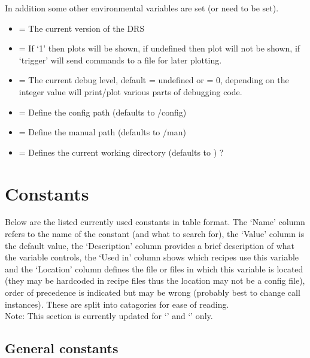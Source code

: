 In addition some other environmental variables are set (or need to be set).
\begin{itemize}
	\item {} = The current version of the DRS
	\item {} = If `1' then plots will be shown, if undefined then plot will not be shown, if `trigger' will send commands to a file for later plotting.
	\item {} = The current debug level, default = undefined or = 0, depending on the integer value will print/plot various parts of debugging code.
	\item {} = Define the config path (defaults to /config)
	\item {} = Define the manual path (defaults to /man)
	\item {} = Defines the current working directory (defaults to ) ?
\end{itemize} 

\section{Constants}
\label{section:the_constants}

Below are the listed currently used constants in table format. The `Name' column refers to the name of the constant (and what to search for), the `Value' column is the default value, the `Description' column provides a brief description of what the variable controls, the `Used in' column shows which recipes use this variable and the `Location' column defines the file or files in which this variable is located (they may be hardcoded in recipe files thus the location may not be a config file), order of precedence is indicated but may be wrong (probably best to change call instances). These are split into catagories for ease of reading. \\

\noindent Note: This section is currently updated for `\caldark' and `\calloc' only.

\vspace{0.5cm}
\subsection{General constants}

